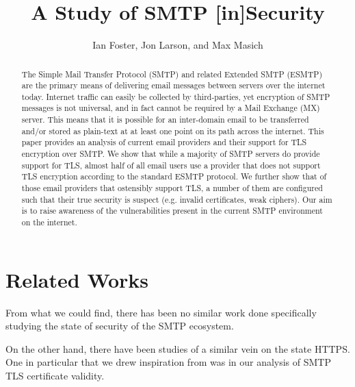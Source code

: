 \documentclass[11pt, twocolumn]{article}
\author{Ian Foster, Jon Larson, and Max Masich}
\title{A Study of SMTP [in]Security}
\date{}
\begin{document}
\maketitle

\begin{abstract}
The Simple Mail Transfer Protocol (SMTP) and related Extended SMTP (ESMTP) are 
the primary means of delivering email messages between servers over the internet 
today.  Internet traffic can easily be collected by third-parties, yet 
encryption of SMTP messages is not universal, and in fact cannot be required by 
a Mail Exchange (MX) server.  This means that it is possible for an inter-domain 
email to be transferred and/or stored as plain-text at at least one point on its 
path across the internet.  This paper provides an analysis of current email 
providers and their support for TLS encryption over SMTP.  We show that while a 
majority of SMTP servers do provide support for TLS, almost half of all email 
users use a provider that does not support TLS encryption according to the 
standard ESMTP protocol.  We further show that of those email providers that 
ostensibly support TLS, a number of them are configured such that their true 
security is suspect (e.g. invalid certificates, weak ciphers).  Our aim is to 
raise awareness of the vulnerabilities present in the current SMTP environment
on the internet.
\end{abstract}




\section{Related Works}
From what we could find, there has been no similar work done specifically 
studying the state of security of the SMTP ecosystem. 

On the other hand, there have been studies of a similar vein on the state HTTPS. 
One in particular that we drew inspiration from was \cite{https} in our analysis 
of SMTP TLS certificate validity. 





\end{document}
